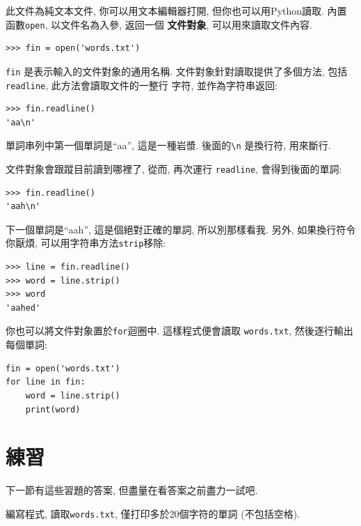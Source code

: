 \documentclass[10pt]{book}
\begin{document}
此文件為純文本文件, 你可以用文本編輯器打開, 
但你也可以用Python讀取. 
內置函數{\tt open}, 以文件名為入參, 返回一個 {\bf 文件對象}, 
可以用來讀取文件內容. 

\begin{verbatim}
>>> fin = open('words.txt')
\end{verbatim}
%
{\tt fin} 是表示輸入的文件對象的通用名稱. 
文件對象針對讀取提供了多個方法, 包括 {\tt readline}, 此方法會讀取文件的一整行
字符, 並作為字符串返回: 

\begin{verbatim}
>>> fin.readline()
'aa\n'
\end{verbatim}
%
單詞串列中第一個單詞是``aa'', 這是一種岩漿. 
後面的\verb"\n" 是換行符, 用來斷行. 

文件對象會跟蹤目前讀到哪裡了, 從而, 再次運行
{\tt readline}, 會得到後面的單詞:

\begin{verbatim}
>>> fin.readline()
'aah\n'
\end{verbatim}
%
下一個單詞是``aah'',  這是個絕對正確的單詞, 所以別那樣看我. 
另外, 如果換行符令你厭煩, 可以用字符串方法{\tt strip}移除:

\begin{verbatim}
>>> line = fin.readline()
>>> word = line.strip()
>>> word
'aahed'
\end{verbatim}
%
你也可以將文件對象置於{\tt for}迴圈中. 
這樣程式便會讀取 {\tt words.txt}, 然後逐行輸出每個單詞:

\begin{verbatim}
fin = open('words.txt')
for line in fin:
    word = line.strip()
    print(word)
\end{verbatim}
%

\section{練習}
下一節有這些習題的答案, 但盡量在看答案之前盡力一試吧. 

\begin{exercise}
編寫程式, 讀取{\tt words.txt}, 僅打印多於20個字符的單詞
(不包括空格). 

\end{exercise}
\end{document}
